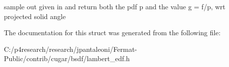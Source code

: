 sample out given in and return both the pdf p and the value g = f/p, wrt projected solid angle 

The documentation for this struct was generated from the following file\+:\begin{DoxyCompactItemize}
\item 
C\+:/p4research/research/jpantaleoni/\+Fermat-\/\+Public/contrib/cugar/bsdf/lambert\+\_\+edf.\+h\end{DoxyCompactItemize}
